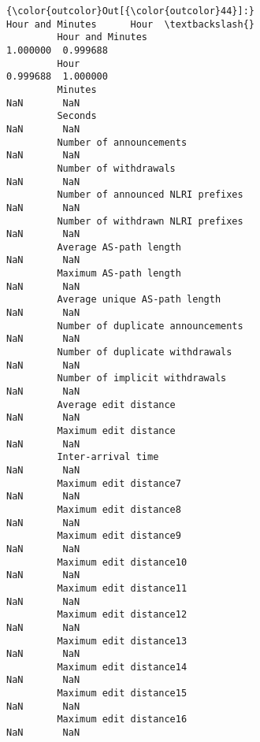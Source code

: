 \documentclass[11pt]{article}
\begin{document}
\begin{Verbatim}[commandchars=\\\{\}]
{\color{outcolor}Out[{\color{outcolor}44}]:}                                                    Hour and Minutes      Hour  \textbackslash{}
         Hour and Minutes                                           1.000000  0.999688   
         Hour                                                       0.999688  1.000000   
         Minutes                                                         NaN       NaN   
         Seconds                                                         NaN       NaN   
         Number of announcements                                         NaN       NaN   
         Number of withdrawals                                           NaN       NaN   
         Number of announced NLRI prefixes                               NaN       NaN   
         Number of withdrawn NLRI prefixes                               NaN       NaN   
         Average AS-path length                                          NaN       NaN   
         Maximum AS-path length                                          NaN       NaN   
         Average unique AS-path length                                   NaN       NaN   
         Number of duplicate announcements                               NaN       NaN   
         Number of duplicate withdrawals                                 NaN       NaN   
         Number of implicit withdrawals                                  NaN       NaN   
         Average edit distance                                           NaN       NaN   
         Maximum edit distance                                           NaN       NaN   
         Inter-arrival time                                              NaN       NaN   
         Maximum edit distance7                                          NaN       NaN   
         Maximum edit distance8                                          NaN       NaN   
         Maximum edit distance9                                          NaN       NaN   
         Maximum edit distance10                                         NaN       NaN   
         Maximum edit distance11                                         NaN       NaN   
         Maximum edit distance12                                         NaN       NaN   
         Maximum edit distance13                                         NaN       NaN   
         Maximum edit distance14                                         NaN       NaN   
         Maximum edit distance15                                         NaN       NaN   
         Maximum edit distance16                                         NaN       NaN   

\end{Verbatim}
\end{document}
